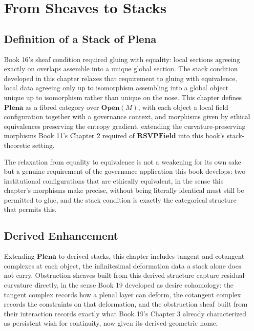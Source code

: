 \part{From Sheaves to Stacks}

\chapter{Definition of a Stack of Plena}

Book 16's sheaf condition required gluing with equality: local sections agreeing exactly on overlaps assemble into a unique global section. The stack condition developed in this chapter relaxes that requirement to gluing with equivalence, local data agreeing only up to isomorphism assembling into a global object unique up to isomorphism rather than unique on the nose. This chapter defines $\mathbf{Plena}$ as a fibred category over $\mathbf{Open}(M)$, with each object a local field configuration together with a governance context, and morphisms given by ethical equivalences preserving the entropy gradient, extending the curvature-preserving morphisms Book 11's Chapter 2 required of $\mathbf{RSVPField}$ into this book's stack-theoretic setting.

The relaxation from equality to equivalence is not a weakening for its own sake but a genuine requirement of the governance application this book develops: two institutional configurations that are ethically equivalent, in the sense this chapter's morphisms make precise, without being literally identical must still be permitted to glue, and the stack condition is exactly the categorical structure that permits this.

\chapter{Derived Enhancement}

Extending $\mathbf{Plena}$ to derived stacks, this chapter includes tangent and cotangent complexes at each object, the infinitesimal deformation data a stack alone does not carry. Obstruction sheaves built from this derived structure capture residual curvature directly, in the sense Book 19 developed as desire cohomology: the tangent complex records how a plenal layer can deform, the cotangent complex records the constraints on that deformation, and the obstruction sheaf built from their interaction records exactly what Book 19's Chapter 3 already characterized as persistent wish for continuity, now given its derived-geometric home.

